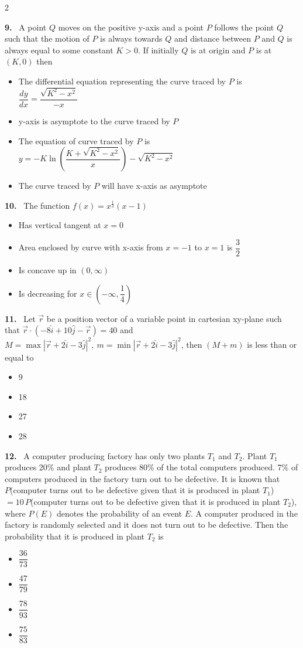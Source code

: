 \documentclass[10pt]{extarticle}
\newcommand{\qn}[1]{\par\smallskip\noindent\textbf{#1.}~}
\newenvironment{qoptions}{\begin{itemize}[leftmargin=1.8em,itemsep=1pt,topsep=2pt,label={}]}{\end{itemize}}
\newcommand{\opt}[2]{\item[(#1)] #2}
\begin{document}
\begin{multicols}{2}
\begin{qoptions}
\end{qoptions}
\qn{9} A point $Q$ moves on the positive y-axis and a point $P$ follows the point $Q$ such that the motion of $P$ is always towards $Q$ and distance between $P$ and $Q$ is always equal to some constant $K>0$. If initially $Q$ is at origin and $P$ is at $(K,0)$ then
\begin{qoptions}
\opt{A}{The differential equation representing the curve traced by $P$ is $\dfrac{dy}{dx}=\dfrac{\sqrt{K^2-x^2}}{-x}$}
\opt{B}{y-axis is asymptote to the curve traced by $P$}
\opt{C}{The equation of curve traced by $P$ is $y=-K\ln\left(\dfrac{K+\sqrt{K^2-x^2}}{x}\right)-\sqrt{K^2-x^2}$}
\opt{D}{The curve traced by $P$ will have x-axis as asymptote}
\end{qoptions}
\qn{10} The function $f(x)=x^{\frac13}(x-1)$
\begin{qoptions}
\opt{A}{Has vertical tangent at $x=0$}
\opt{B}{Area enclosed by curve with x-axis from $x=-1$ to $x=1$ is $\dfrac32$}
\opt{C}{Is concave up in $(0,\infty)$}
\opt{D}{Is decreasing for $x\in\left(-\infty,\dfrac14\right)$}
\end{qoptions}
\qn{11} Let $\vec r$ be a position vector of a variable point in cartesian xy-plane such that $\vec r\cdot\left(-8\hat i+10\hat j-\vec r\right)=40$ and $M=\max\left|\vec r+2\hat i-3\hat j\right|^2,\ m=\min\left|\vec r+2\hat i-3\hat j\right|^2$, then $(M+m)$ is less than or equal to
\begin{qoptions}
\opt{A}{9}
\opt{B}{18}
\opt{C}{27}
\opt{D}{28}
\end{qoptions}
\qn{12} A computer producing factory has only two plants $T_1$ and $T_2$. Plant $T_1$ produces 20\% and plant $T_2$ produces 80\% of the total computers produced. 7\% of computers produced in the factory turn out to be defective. It is known that\\
$P$(computer turns out to be defective given that it is produced in plant $T_1$)\\
\hspace*{1.5em}$=10\,P$(computer turns out to be defective given that it is produced in plant $T_2$),\\
where $P(E)$ denotes the probability of an event $E$. A computer produced in the factory is randomly selected and it does not turn out to be defective. Then the probability that it is produced in plant $T_2$ is
\begin{qoptions}
\opt{A}{$\dfrac{36}{73}$}
\opt{B}{$\dfrac{47}{79}$}
\opt{C}{$\dfrac{78}{93}$}
\opt{D}{$\dfrac{75}{83}$}
\end{qoptions}

\end{multicols}
\end{document}
